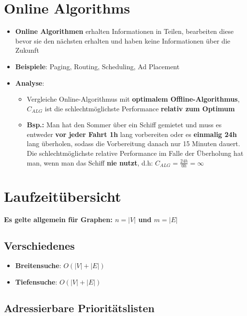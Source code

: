\documentclass[10pt,a4paper]{article}
\begin{document}
	\section{Online Algorithms}
	\label{oa:sec:online_algorithms}

	\begin{itemize}
		\item \textbf{Online Algorithmen} erhalten Informationen in Teilen, bearbeiten diese bevor sie den nächsten erhalten und haben keine Informationen über die Zukunft
		\item \textbf{Beispiele}: Paging, Routing, Scheduling, Ad Placement
		\item \textbf{Analyse}:
		\begin{itemize}
			\item Vergleiche Online-Algorithmus mit \textbf{optimalem Offline-Algorithmus}, $C_{ALG}$ ist die schlechtmöglichste Performance \textbf{relativ zum Optimum}
			\item \textbf{Bsp.:} Man hat den Sommer über ein Schiff gemietet und muss es entweder \textbf{vor jeder Fahrt 1h} lang vorbereiten oder es \textbf{einmalig 24h} lang überholen, sodass die Vorbereitung danach nur 15 Minuten dauert. Die schlechtmöglichste relative Performance im Falle der Überholung hat man, wenn man das Schiff \textbf{nie nutzt}, d.h: $C_{ALG} = \frac{24h}{0h} = \infty$
		\end{itemize}
	\end{itemize}

	\newpage
	\section{Laufzeitübersicht}
	\label{lz:sec:laufzeituebersicht}
	\textbf{Es gelte allgemein für Graphen: $n = |V|$ und $m = |E|$}

	\subsection{Verschiedenes}
	\label{lz:sub:verschiedenes}
	
	\begin{itemize}
		\item \textbf{Breitensuche}: $O(|V| + |E|)$
		\item \textbf{Tiefensuche}: $O(|V| + |E|)$
	\end{itemize}

	\subsection{Adressierbare Prioritätslisten}
	\label{lz:sub:adressierbare_prioritaetslisten}
	
\end{document}
